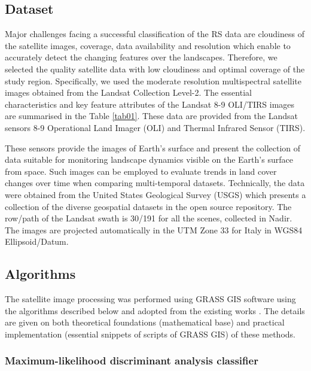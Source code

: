 \documentclass{elektr}
\begin{document}
\subsection{Dataset}

Major challenges facing a successful classification of the RS data are cloudiness of the satellite images, coverage, data availability and resolution which enable to accurately detect the changing features over the landscapes. Therefore, we selected the quality satellite data with low cloudiness and optimal coverage of the study region. Specifically, we used the moderate resolution multispectral satellite images obtained from the Landsat Collection Level-2. The essential characteristics and key feature attributes of the Landsat 8-9 OLI/TIRS images are summarised in the Table \ref{tab01}. These data are provided from the Landsat sensors 8-9 Operational Land Imager (OLI) and Thermal Infrared Sensor (TIRS). 

These sensors provide the images of Earth's surface and present the collection of data suitable for monitoring landscape dynamics visible on the Earth's surface from space. Such images can be employed to evaluate trends in land cover changes over time when comparing multi-temporal datasets. Technically, the data were obtained from the United States Geological Survey (USGS) which presents a collection of the diverse geospatial datasets in the open source repository. The row/path of the Landsat swath is 30/191 for all the scenes, collected in Nadir. The images are projected automatically in the UTM Zone 33 for Italy in WGS84 Ellipsoid/Datum. 

\subsection{Algorithms}

The satellite image processing was performed using GRASS GIS software using the algorithms described below and adopted from the existing works \cite{Lemenkova202217,Lemenkova202313}. The details are given on both theoretical foundations (mathematical base) and practical implementation (essential snippets of scripts of GRASS GIS) of these methods.

\subsubsection{Maximum-likelihood discriminant analysis classifier}
\end{document}
